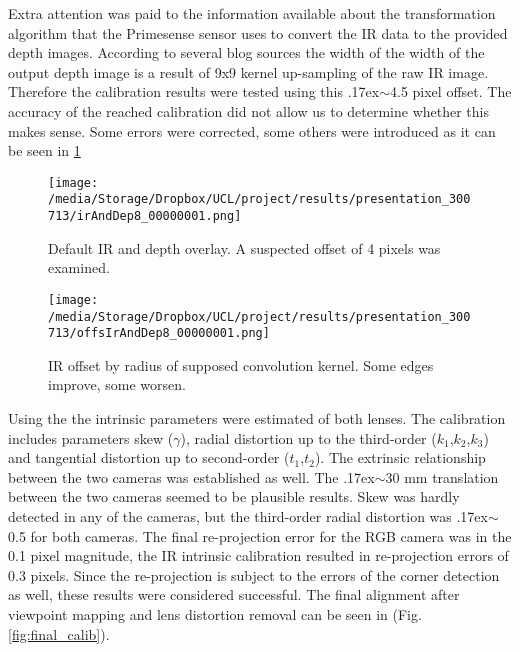 \documentclass{ucl_thesis}
\newcommand{\figref}[1]{(Fig. \ref{#1})}
\newcommand{\mytilde}{\raise.17ex\hbox{$\scriptstyle\mathtt{\sim}$}}
\begin{document}
\par Extra attention was paid to the information available about the transformation algorithm that the Primesense sensor uses to convert the IR data to the provided depth images. According to several blog sources the width of the width of the output depth image is a result of 9x9 kernel up-sampling of the raw IR image. Therefore the calibration results were tested using this \mytilde 4.5 pixel offset. The accuracy of the reached calibration did not allow us to determine whether this makes sense. Some errors were corrected, some others were introduced as it can be seen in \ref{fig:calib_ir_depth}


\begin{figure}[h!]\centering
    \begin{minipage}[b]{0.49\linewidth} 
        \texttt{[image: /media/Storage/Dropbox/UCL/project/results/presentation\_300713/irAndDep8\_00000001.png]}
        \caption{Default IR and depth overlay. A suspected offset of 4 pixels was examined.}
        \label{fig:ir}
    \end{minipage}
    \begin{minipage}[b]{0.49\linewidth}
        \texttt{[image: /media/Storage/Dropbox/UCL/project/results/presentation\_300713/offsIrAndDep8\_00000001.png]}
        \caption{IR offset by radius of supposed convolution kernel. Some edges improve, some worsen.}
            \label{fig:calib_ir_depth}
    \end{minipage}
\end{figure}

\par Using the \citep{calibration_bouguet} the intrinsic parameters were estimated of both lenses. The calibration includes parameters skew ($\gamma$), radial distortion up to the third-order ($k_1$,$k_2$,$k_3$) and tangential distortion up to second-order ($t_1$,$t_2$). The extrinsic relationship between the two cameras was established as well. The \mytilde 30 mm translation between the two cameras seemed to be plausible results. Skew was hardly detected in any of the cameras, but the third-order radial distortion was \mytilde 0.5 for both cameras. The final re-projection error for the RGB camera was in the 0.1 pixel magnitude, the IR intrinsic calibration resulted in re-projection errors of 0.3 pixels. Since the re-projection is subject to the errors of the corner detection as well, these results were considered successful. The final alignment after viewpoint mapping and lens distortion removal can be seen in \figref{fig:final_calib}.
\end{document}
